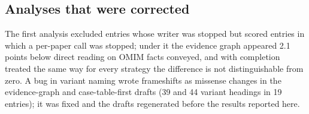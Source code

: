 \documentclass{article} %
\begin{document}
\FloatBarrier
\subsection{Analyses that were corrected}
The first analysis excluded entries whose writer was stopped but scored entries in which a per-paper call was stopped; under it the evidence graph appeared 2.1 points below direct reading on OMIM facts conveyed, and with completion treated the same way for every strategy the difference is not distinguishable from zero. A bug in variant naming wrote frameshifts as missense changes in the evidence-graph and case-table-first drafts (39 and 44 variant headings in 19 entries); it was fixed and the drafts regenerated before the results reported here.
\FloatBarrier
\FloatBarrier
\FloatBarrier
\end{document}
